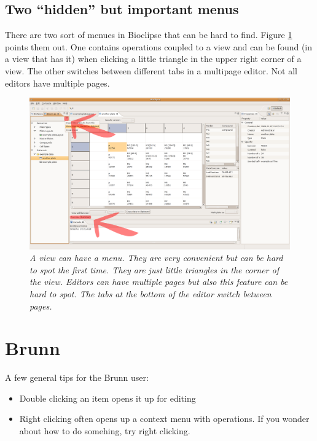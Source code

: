 \documentclass[a4paper,10pt]{article}
\begin{document}
        \subsection{Two ``hidden'' but important menus}

            There are two sort of menues in Bioclipse that can be
            hard to find. Figure \ref{viewMenu} points them out. One contains
            operations coupled to a view and can be found (in a view that has
            it) when clicking a little triangle in the upper right corner of a
            view. The other switches between different tabs in a multipage
            editor. Not all editors have multiple pages.
            \begin{figure}[htbp]
                \begin{center}
                    \includegraphics[width=1\textwidth]{images/twoMenues.png}
                \end{center}
                \caption{\textit{A view can have a menu. They are very
                    convenient but can be hard to spot the first time. They are
                    just little triangles in the corner of the view. Editors
                    can have multiple pages but also this feature can be hard
                    to spot. The tabs at the bottom of the editor switch
                    between pages.}}
                \label{viewMenu}
            \end{figure}

    \section{Brunn}
        
         \begin{minipage}{1\textwidth}
            A few general tips for the Brunn user:
            \begin{itemize}
                \item Double clicking an item opens it up for editing
                \item Right clicking often opens up a context menu with
                    operations. If you wonder about how to do somehing, try
                    right clicking.
            \end{itemize}
         \end{minipage}
\end{document}
